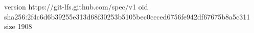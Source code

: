 version https://git-lfs.github.com/spec/v1
oid sha256:2f4c6d6b39255e313d68f30253b5105bec0ceced6756fe942df67675b8a5c311
size 1908
